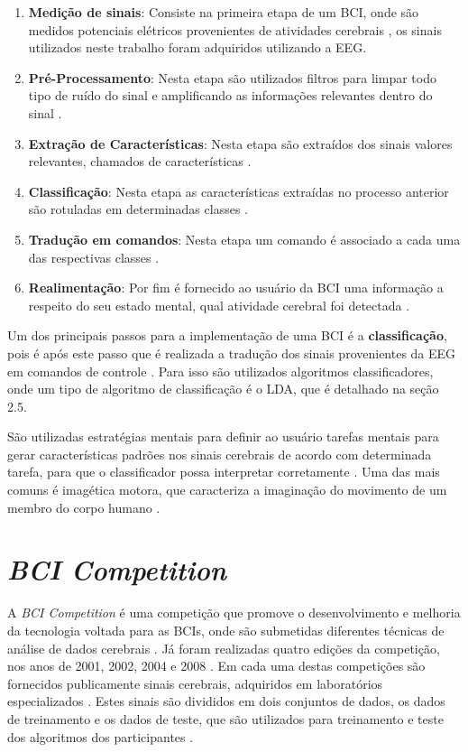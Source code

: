 \begin{enumerate}
	\item \textbf{Medição de sinais}: Consiste na primeira etapa de um BCI, onde são medidos potenciais elétricos provenientes de atividades cerebrais \cite{SIULYDissertacao}, os sinais utilizados neste trabalho foram adquiridos utilizando a EEG.
	\item \textbf{Pré-Processamento}: Nesta etapa são utilizados filtros para limpar todo tipo de ruído do sinal e amplificando as informações relevantes dentro do sinal \cite{SIULYDissertacao}.
	\item \textbf{Extração de Características}: Nesta etapa são extraídos dos sinais valores relevantes, chamados de características \cite{SIULYDissertacao}.
	\item \textbf{Classificação}: Nesta etapa as características extraídas no processo anterior são rotuladas em determinadas classes \cite{SIULYDissertacao}. 
	\item \textbf{Tradução em comandos}: Nesta etapa um comando é associado a cada uma das respectivas classes \cite{SIULYDissertacao}.
	\item \textbf{Realimentação}: Por fim é fornecido ao usuário da BCI uma informação a respeito do seu estado mental, qual atividade cerebral foi detectada \cite{SIULYDissertacao}.
\end{enumerate}

Um dos principais passos para a implementação de uma
BCI é a \textbf{classificação}, pois é após este passo que é realizada a tradução dos sinais provenientes da EEG
em comandos de controle \cite{MasonAndBirch}. Para isso são utilizados algoritmos classificadores, onde um tipo de algoritmo de classificação é o LDA, que é detalhado na seção 2.5.

São utilizadas estratégias mentais para definir ao usuário tarefas mentais para gerar características padrões nos sinais cerebrais de acordo com determinada tarefa, para que o classificador possa interpretar corretamente \cite{SIULYDissertacao}. Uma das mais comuns é imagética motora, que caracteriza a imaginação do movimento de um membro do corpo humano \cite{SIULYDissertacao}.  

\section{\textit{BCI Competition}}
A \textit{BCI Competition} é uma competição que promove o desenvolvimento e melhoria da tecnologia voltada para as BCIs, onde são submetidas diferentes técnicas de análise de dados cerebrais \cite{BCICompetition}. Já foram realizadas quatro edições da competição, nos anos de 2001, 2002, 2004 e 2008 \cite{BCICompetition}. Em cada uma destas competições são fornecidos publicamente sinais cerebrais, adquiridos em laboratórios especializados \cite{BCICompetition}. Estes sinais são divididos em dois conjuntos de dados, os dados de treinamento e os dados de teste, que são utilizados para treinamento e teste dos algoritmos dos participantes \cite{BCICompetition}.

